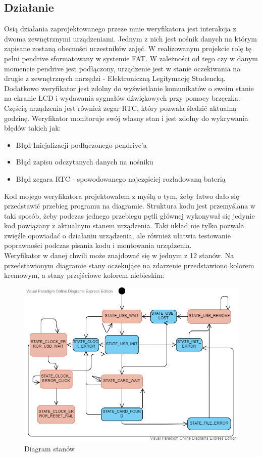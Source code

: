\documentclass[declaration,shortabstract, mgr]{iithesis}
\begin{document}
\subsection{Działanie}
\indent Osią działania zaprojektowanego przeze mnie weryfikatora jest interakcja z dwoma zewnętrznymi urządzeniami. Jednym z nich jest nośnik danych na którym zapisane zostaną obecności uczestników zajęć. W realizowanym projekcie rolę tę pełni pendrive sformatowany w systemie FAT. W zależności od tego czy w danym momencie pendrive jest podłączony, urządzenie jest w stanie oczekiwania na drugie z zewnętrznych narzędzi - Elektroniczną Legitymację Studencką. Dodatkowo weryfikator jest zdolny do wyświetlanie komunikatów o swoim stanie na ekranie LCD i wydawania sygnałów dźwiękowych przy pomocy brzęczka. Częścią urządzenia jest również zegar RTC, który pozwala śledzić aktualną godzinę. Weryfikator monitoruje swój własny stan i jest zdolny do wykrywania błędów takich jak:
\begin{itemize}
\item Błąd Inicjalizacji podłączonego pendrive'a
\item Błąd zapisu odczytanych danych na nośniku
\item Błąd zegara RTC - spowodowanego najczęściej rozładowaną baterią
\end{itemize}
\indent Kod mojego weryfikatora projektowałem z myślą o tym, żeby łatwo dało się przedstawić przebieg programu na diagramie. Struktura kodu jest przemyślana w taki sposób, żeby podczas jednego przebiegu pętli głównej wykonywał się jedynie kod powiązany z aktualnym stanem urządzenia. Taki układ nie tylko pozwala zwięźle opowiadać o działaniu urządzenia, ale również ułatwia testowanie poprawności podczas pisania kodu i montowania urządzenia.\\
\indent Weryfikator w danej chwili może znajdować się w jednym z 12 stanów. Na przedstawionym diagramie stany oczekujące na zdarzenie przedstawiono kolorem kremowym, a stany przejściowe kolorem niebieskim:
\begin{figure}[h]
\caption{Diagram stanów}
\centering
\includegraphics[scale=0.6]{state_machine.png}
\end{figure}
\end{document}
